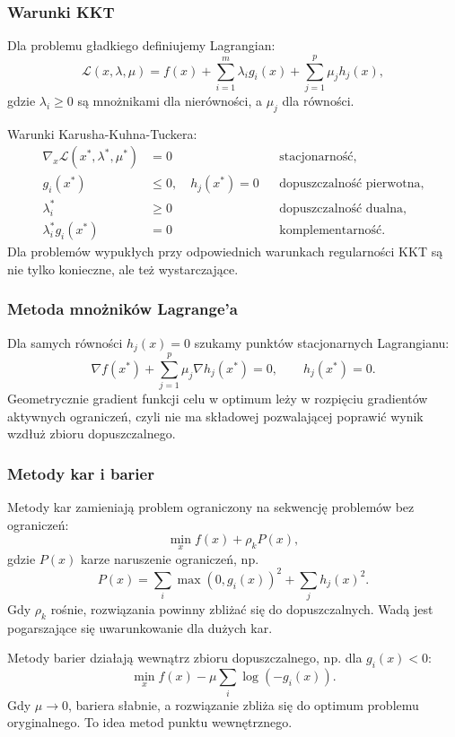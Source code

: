 \subsubsection{Warunki KKT}

Dla problemu gładkiego definiujemy Lagrangian:
\[
\mathcal{L}(x,\lambda,\mu)=f(x)+\sum_{i=1}^{m}\lambda_i g_i(x)+\sum_{j=1}^{p}\mu_j h_j(x),
\]
gdzie $\lambda_i\ge 0$ są mnożnikami dla nierówności, a $\mu_j$ dla równości.

Warunki Karusha-Kuhna-Tuckera:
\begin{align*}
\nabla_x \mathcal{L}(x^*,\lambda^*,\mu^*)&=0 &&\text{stacjonarność},\\
g_i(x^*)&\le 0,\quad h_j(x^*)=0 &&\text{dopuszczalność pierwotna},\\
\lambda_i^*&\ge 0 &&\text{dopuszczalność dualna},\\
\lambda_i^* g_i(x^*)&=0 &&\text{komplementarność}.
\end{align*}
Dla problemów wypukłych przy odpowiednich warunkach regularności KKT są nie tylko konieczne, ale też wystarczające.

\subsubsection{Metoda mnożników Lagrange'a}

Dla samych równości $h_j(x)=0$ szukamy punktów stacjonarnych Lagrangianu:
\[
\nabla f(x^*)+\sum_{j=1}^{p}\mu_j\nabla h_j(x^*)=0,\qquad h_j(x^*)=0.
\]
Geometrycznie gradient funkcji celu w optimum leży w rozpięciu gradientów aktywnych ograniczeń, czyli nie ma składowej pozwalającej poprawić wynik wzdłuż zbioru dopuszczalnego.

\subsubsection{Metody kar i barier}

Metody kar zamieniają problem ograniczony na sekwencję problemów bez ograniczeń:
\[
\min_x f(x)+\rho_k P(x),
\]
gdzie $P(x)$ karze naruszenie ograniczeń, np.
\[
P(x)=\sum_i \max(0,g_i(x))^2+\sum_j h_j(x)^2.
\]
Gdy $\rho_k$ rośnie, rozwiązania powinny zbliżać się do dopuszczalnych. Wadą jest pogarszające się uwarunkowanie dla dużych kar.

Metody barier działają wewnątrz zbioru dopuszczalnego, np. dla $g_i(x)<0$:
\[
\min_x f(x)-\mu\sum_i \log(-g_i(x)).
\]
Gdy $\mu\to 0$, bariera słabnie, a rozwiązanie zbliża się do optimum problemu oryginalnego. To idea metod punktu wewnętrznego.

